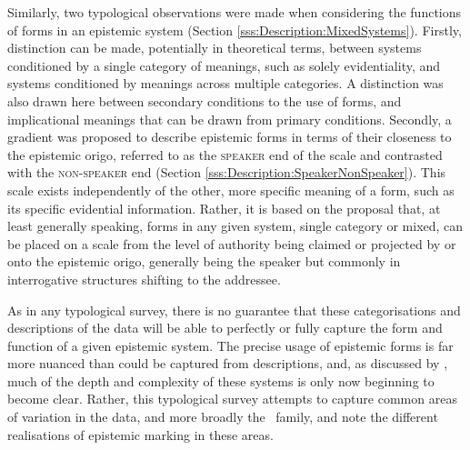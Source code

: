 Similarly, two typological observations were made when considering the functions of forms in an epistemic system (Section \ref{sss:Description:MixedSystems}). Firstly, distinction can be made, potentially in theoretical terms, between systems conditioned by a single category of meanings, such as solely evidentiality, and systems conditioned by meanings across multiple categories. A distinction was also drawn here between secondary conditions to the use of forms, and implicational meanings that can be drawn from primary conditions. Secondly, a gradient was proposed to describe epistemic forms in terms of their closeness to the epistemic origo, referred to as the \textsc{speaker} end of the scale and contrasted with the \textsc{non-speaker} end (Section \ref{sss:Description:SpeakerNonSpeaker}). This scale exists independently of the other, more specific meaning of a form, such as its specific evidential information. Rather, it is based on the proposal that, at least generally speaking, forms in any given system, single category or mixed, can be placed on a scale from the level of authority being claimed or projected by or onto the epistemic origo, generally being the speaker but commonly in interrogative structures shifting to the addressee.

As in any typological survey, there is no guarantee that these categorisations and descriptions of the data will be able to perfectly or fully capture the form and function of a given epistemic system. The precise usage of epistemic forms is far more nuanced than could be captured from descriptions, and, as discussed by , much of the depth and complexity of these systems is only now beginning to become clear. Rather, this typological survey attempts to capture common areas of variation in the data, and more broadly the \lfam\ family, and note the different realisations of epistemic marking in these areas.
